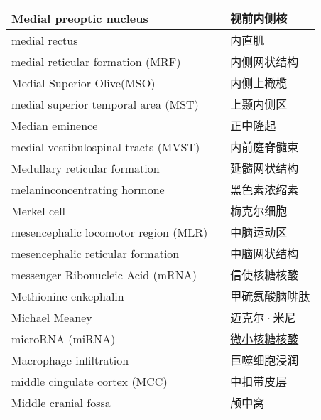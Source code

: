 \begin{longtable}{lll}
	\midrule
	Medial preoptic nucleus    && 视前内侧核  \\
	
	\midrule
	medial rectus    && 内直肌  \\
	
	\midrule
	medial reticular formation (MRF)    && 内侧网状结构  \\
	
	\midrule
	Medial Superior Olive(MSO)   && 内侧上橄榄  \\
	
	\midrule
	medial superior temporal area (MST)   && 上颞内侧区  \\
	
	\midrule
	Median eminence   && 正中隆起  \\
	
	\midrule
	medial vestibulospinal tracts (MVST) && 内前庭脊髓束  \\
	
	\midrule
	Medullary reticular formation && 延髓网状结构  \\
	
	\midrule
	melaninconcentrating hormone && 黑色素浓缩素  \\
	
	\midrule
	Merkel cell && 梅克尔细胞  \\
	
	\midrule
	mesencephalic locomotor region (MLR)   && 中脑运动区  \\
	
	\midrule
	mesencephalic reticular formation   && 中脑网状结构  \\
	
	\midrule
	messenger Ribonucleic Acid (mRNA)   && 信使核糖核酸  \\
	
	\midrule
	Methionine-enkephalin   && 甲硫氨酸脑啡肽  \\
	
	\midrule
	Michael Meaney   && 迈克尔·米尼  \\
	
	\midrule
	microRNA (miRNA)   && \href{https://baike.baidu.com/item/micro\%20RNA/3683223}{微小核糖核酸}  \\
	
	\midrule
	Macrophage infiltration   && 巨噬细胞浸润  \\
	
	\midrule
	middle cingulate cortex (MCC)   && 中扣带皮层  \\
	
	\midrule
	Middle cranial fossa   && 颅中窝  \\
	

\end{longtable}
